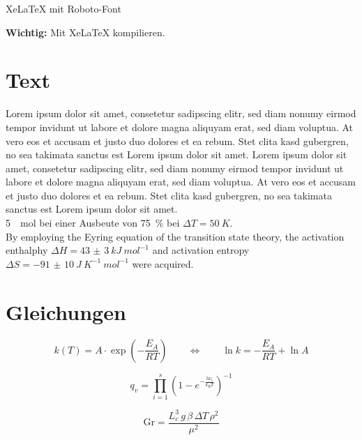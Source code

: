 \documentclass[12pt,a4paper]{article}
\begin{document}
\begin{center}\Large
XeLaTeX mit Roboto-Font
\end{center}

\begin{center}
\textbf{Wichtig:} Mit XeLaTeX kompilieren.
\end{center}

\section{Text}\sloppy
Lorem ipsum dolor sit amet, consetetur sadipscing elitr, sed diam nonumy eirmod tempor invidunt ut labore et dolore magna aliquyam erat, sed diam voluptua. At vero eos et accusam et justo duo dolores et ea rebum. Stet clita kasd gubergren, no sea takimata sanctus est Lorem ipsum dolor sit amet. Lorem ipsum dolor sit amet, consetetur sadipscing elitr, sed diam nonumy eirmod tempor invidunt ut labore et dolore magna aliquyam erat, sed diam voluptua. At vero eos et accusam et justo duo dolores et ea rebum. Stet clita kasd gubergren, no sea takimata sanctus est Lorem ipsum dolor sit amet.\\

\SI{5}{\mu mol} bei einer Ausbeute von \SI{75}{\%} bei $\Delta T=\SI{50}{K}$. \\

By employing the Eyring equation of the transition state theory, the activation enthalphy $\Delta H=\SI{43(3)}{kJ\:mol^{-1}}$ and activation entropy $\Delta S=\SI{-91(10)}{J\:K^{-1}\:mol^{-1}}$ were acquired.


\section{Gleichungen}
\begin{equation}
k(T)=A\cdot\exp\left(-\frac{E_A}{RT}\right)\qquad\Leftrightarrow\qquad \ln k=-\frac{E_A}{RT}+\ln A
\end{equation}

\begin{equation}
q_v=\prod_{i=1}^s\left(1-e^{-\frac{h\nu_i}{k_\textrm{B}T}}\right)^{-1}
\end{equation}

\begin{equation}
\textrm{Gr}=\frac{L_c^3\,g\,\beta\,\Delta T\,\rho^2}{\mu^2}
\end{equation}
\end{document}
